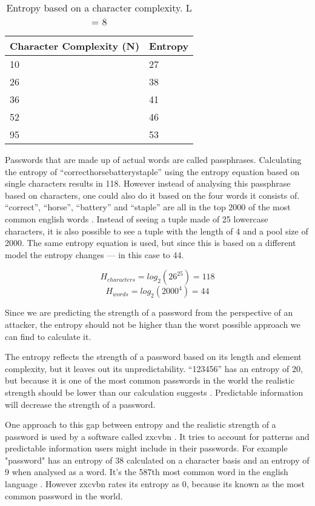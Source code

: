 \begin{table}[h!]
\centering
\begin{tabular}{l l}
    Character Complexity (N) & Entropy \\
    \hline
    10                       & 27 \\
    26                       & 38 \\
    36                       & 41 \\
    52                       & 46 \\
    95                       & 53
\end{tabular}
\caption{Entropy based on a character complexity. L = 8}
\end{table}

Passwords that are made up of actual words are called passphrases. Calculating the entropy of ``correcthorsebatterystaple'' using the entropy equation based on single characters results in 118. However instead of analysing this passphrase based on characters, one could also do it based on the four words it consists of. ``correct'', ``horse'', ``battery'' and ``staple'' are all in the top 2000 of the most common english words \cite{commonwords}. Instead of seeing a tuple made of 25 lowercase characters, it is also possible to see a tuple with the length of 4 and a pool size of 2000. The same entropy equation is used, but since this is based on a different model the entropy changes --- in this case to 44.

\begin{equation}
H_{characters} = log_2(26^{25}) = 118
\end{equation}
\begin{equation}
H_{words} = log_2(2000^4) = 44
\end{equation}

Since we are predicting the strength of a password from the perspective of an attacker, the entropy should not be higher than the worst possible approach we can find to calculate it.

The entropy reflects the strength of a password based on its length and element complexity, but it leaves out its unpredictability. ``123456'' has an entropy of 20, but because it is one of the most common passwords in the world the realistic strength should be lower than our calculation suggests \cite{passwordquality}. Predictable information will decrease the strength of a password.

One approach to this gap between entropy and the realistic strength of a password is used by a software called zxcvbn \cite{zxcvbn}. It tries to account for patterns and predictable information users might include in their passwords. For example "password" has an entropy of 38 calculated on a character basis and an entropy of 9 when analysed as a word. It's the 587th most common word in the english language \cite{commonwords}. However zxcvbn rates its entropy as 0, because its known as the most common password in the world.

\newpage
